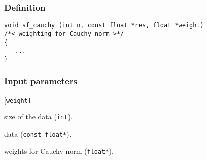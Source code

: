\subsubsection*{Definition}
\begin{verbatim}
void sf_cauchy (int n, const float *res, float *weight)  
/*< weighting for Cauchy norm >*/
{
   ...
}
\end{verbatim}

\subsubsection*{Input parameters}
\begin{desclist}{\tt }{\quad}[\tt weight]
   \setlength\itemsep{0pt}
   \item[n]      size of the data (\texttt{int}).  
   \item[res]    data (\texttt{const float*}).  
   \item[weight] weights for Cauchy norm (\texttt{float*}).  
\end{desclist}


